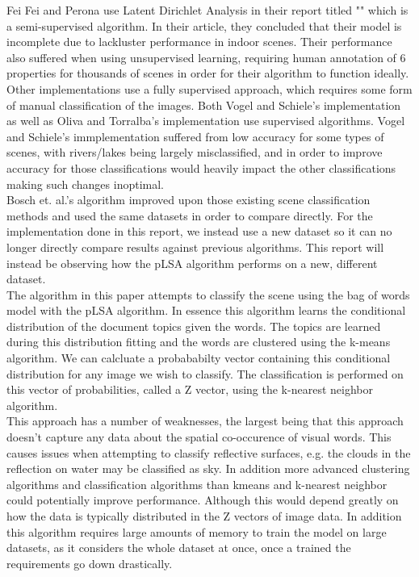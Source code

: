\documentclass[conference]{IEEEtran}
\begin{document}
Fei Fei and Perona \cite{fei} use Latent Dirichlet Analysis in their report titled "" which is a semi-supervised algorithm. In their article, they concluded that their model is incomplete due to lackluster performance in indoor scenes. Their performance also suffered when using unsupervised learning, requiring human annotation of 6 properties for thousands of scenes in order for their algorithm to function ideally.\\

Other implementations use a fully supervised approach, which requires some form of manual classification of the images. Both Vogel and Schiele's \cite{vogel} implementation as well as Oliva and Torralba's \cite{oliva} implementation use supervised algorithms. Vogel and Schiele's immplementation suffered from low accuracy for some types of scenes, with rivers/lakes being largely misclassified, and in order to improve accuracy for those classifications would heavily impact the other classifications making such changes inoptimal.\\

Bosch et. al.'s algorithm improved upon those existing scene classification methods and used the same datasets in order to compare directly. For the implementation done in this report, we instead use a new dataset so it can no longer directly compare results against previous algorithms. This report will instead be observing how the pLSA algorithm performs on a new, different dataset.\\

The algorithm in this paper attempts to classify the scene using the bag of words model with the pLSA algorithm. In essence this algorithm learns the conditional distribution of the document topics given the words. The topics are learned during this distribution fitting and the words are clustered using the k-means algorithm. We can calcluate a probababilty vector containing this conditional distribution for any image we wish to classify. The classification is performed on this vector of probabilities, called a Z vector, using the k-nearest neighbor algorithm.\\

This approach has a number of weaknesses, the largest being that this approach doesn't capture any data about the spatial co-occurence of visual words. This causes issues when attempting to classify reflective surfaces, e.g. the clouds in the reflection on water may be classified as sky. In addition more advanced clustering algorithms and classification algorithms than kmeans and k-nearest neighbor could potentially improve performance. Although this would depend greatly on how the data is typically distributed in the Z vectors of image data. In addition this algorithm requires large amounts of memory to train the model on large datasets, as it considers the whole dataset at once, once a trained the requirements go down drastically.
\end{document}
